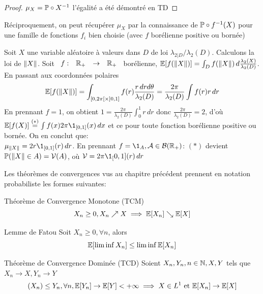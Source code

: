 \documentclass[]{report}
\begin{document}
    \begin{proof}
        $\mu_X=\mathbb{P}\circ X^{-1}$ l'égalité a été démontré en TD
    \end{proof}

    \begin{re}{}{}
        Réciproquement, on peut récupérer $\mu_X$ par la connaissance de $\mathbb{P}\circ f^{-1}(X)$ pour une famille de fonctions $f_i$ bien choisie (avec $f$ borélienne positive ou bornée)
    \end{re}

    \begin{ex}{}{}
        Soit $X$ une variable aléatoire à valeurs dans $D$ de loi $\lambda_{2|D}/\lambda_2(D)$. Calculons la loi de $\lVert X \rVert$. Soit $\begin{array}{ccccc} f : & \mathbb{R}_+ & \to & \mathbb{R}_+ \end{array}$ borélienne, $\mathbb{E}[f(\lVert X \rVert)]=\int_{D}f(\lVert X \rVert)\,d\frac{\lambda_2(X)}{\lambda_2(D)}$. En passant aux coordonnées polaires\\
        \[\mathbb{E}[f(\lVert X \rVert)]=\int_{[0,2\pi[\times ]0,1]}f(r)\frac{r\,drd\theta}{\lambda_2(D)}=\frac{2\pi}{\lambda_2(D)}\int f(r)r\,dr\]
        En prennant $f=1$, on obtient $1=\frac{2\pi}{\lambda_2(D)}\int_{0}^{1} r\,dr$ donc $\frac{2\pi}{\lambda_2(D)}=2$, d'où $\Ea[f(X)]\overset{(*)}{=}\int f(x)2\pi \1_{[0,1]}(x)\,dx$ et ce pour toute fonction borélienne positive ou bornée. On en conclut que:\\
        $\mu_{\norme{X}}=2r\1_{[0,1]}(r)\,dr$. En prennant $f=\1_A,\Ar\in\Br(\R_+)$: $(*)$ devient $\mathbb{P}(\lVert X \rVert\in A)=\mathcal{V}(A)$, où $\Vr=2\pi\1_[0,1](r)\,dr$
    \end{ex}

    Les théorèmes de convergences vus au chapitre précédent prennent en notation probabiliste les formes suivantes:

    \begin{tm}{Théorème de Convergence Monotone (TCM)}{}
        \[X_n\ge 0,X_n\nearrow X\implies \mathbb{E}[X_n]\searrow \mathbb{E}[X]\]
    \end{tm}

    \begin{lm}{Lemme de Fatou}{}
        Soit $X_n\ge 0,\forall n$, alors
        \[\mathbb{E}[\liminf X_n]\le \liminf \mathbb{E}[X_n]\]
    \end{lm}

    \begin{tm}{Théorème de Convergence Dominée (TCD)}{}
        Soient $X_n,Y_n,n\in \mathbb{N},X,Y$ tels que $X_n\to X, Y_n\to Y$
        \[(X_n)\le Y_n,\forall n, \mathbb{E}[Y_n]\to\mathbb{E}[Y]<+\infty\implies X\in L^1\text{ et }\mathbb{E}[X_n]\to \mathbb{E} [X]\]
    \end{tm}
\end{document}
